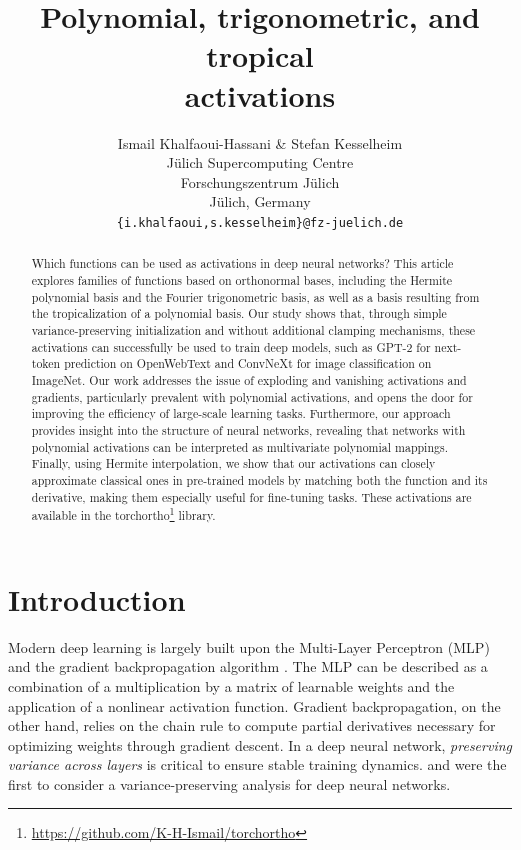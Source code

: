\documentclass{article} %
\title{Polynomial, trigonometric, and tropical \\ activations}
\author{Ismail Khalfaoui-Hassani \& Stefan Kesselheim\\
Jülich Supercomputing Centre\\
Forschungszentrum Jülich\\
Jülich, Germany\\
\texttt{\{i.khalfaoui,s.kesselheim\}@fz-juelich.de}\\
}
\theoremstyle{plain}
\theoremstyle{definition}
\newtheorem{definition}[theorem]{Definition}
\theoremstyle{remark}
\begin{document}
\maketitle

\begin{abstract}
Which functions can be used as activations in deep neural networks? This article explores families of functions based on orthonormal bases, including the Hermite polynomial basis and the Fourier trigonometric basis, as well as a basis resulting from the tropicalization of a polynomial basis. Our study shows that, through simple variance-preserving initialization and without additional clamping mechanisms, these activations can successfully be used to train deep models, such as GPT-2 for next-token prediction on OpenWebText and ConvNeXt for image classification on ImageNet. Our work addresses the issue of exploding and vanishing activations and gradients, particularly prevalent with polynomial activations, and opens the door for improving the efficiency of large-scale learning tasks. Furthermore, our approach provides insight into the structure of neural networks, revealing that networks with polynomial activations can be interpreted as multivariate polynomial mappings. Finally, using Hermite interpolation, we show that our activations can closely approximate classical ones in pre-trained models by matching both the function and its derivative, making them especially useful for fine-tuning tasks. These activations are available in the torchortho\footnote{\href{https://github.com/K-H-Ismail/torchortho}{https://github.com/K-H-Ismail/torchortho}} library.
\end{abstract}

\section{Introduction}
\label{sec:intro}
Modern deep learning is largely built upon the Multi-Layer Perceptron (MLP) \cite{mcculloch1943logical, rosenblatt1958perceptron} and the gradient backpropagation algorithm \cite{rumelhart1986learning}. The MLP can be described as a combination of a multiplication by a matrix of learnable weights and the application of a nonlinear activation function. Gradient backpropagation, on the other hand, relies on the chain rule to compute partial derivatives necessary for optimizing weights through gradient descent. In a deep neural network, \emph{preserving variance across layers} is critical to ensure stable training dynamics. 
\citet{glorot2010understanding} and \citet{he2015delving} were the first to consider a variance-preserving analysis for deep neural networks. %
\end{document}
